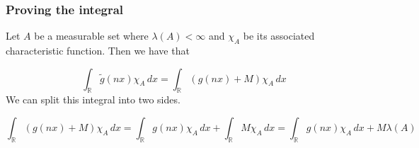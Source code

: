 \documentclass{article}
\theoremstyle{definition}
\numberwithin{theorem}{section}
\numberwithin{equation}{section}
\begin{document}
\subsubsection{Proving the integral}
Let $A$ be a measurable set where $\lambda(A) < \infty$ and $\chi_A$ be its associated characteristic function. Then we have that

\begin{equation}
	\int_{\mathbb{R}} \tilde{g}(nx) \chi_A \, dx = \int_{\mathbb{R}} \left(g(nx) + M\right) \chi_A \, dx
\end{equation}
We can split this integral into two sides. 

\begin{equation}
	\int_{\mathbb{R}} \left(g(nx) + M\right) \chi_A \, dx = \int_{\mathbb{R}}  g(nx) \chi_A \, dx + \int_{\mathbb{R}} M \chi_A \, dx = \int_{\mathbb{R}}  g(nx) \chi_A \, dx + M \lambda(A)
\end{equation}
\end{document}
